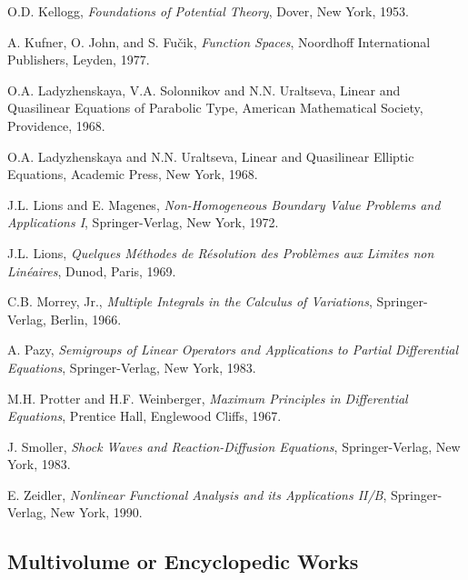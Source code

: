 \begin{list}{}{\setlength{\labelwidth}{3em}\setlength{\leftmargin}{4em}\setlength{\labelsep}{.8em}}
\item[{[Ke]}] O.D. Kellogg, \emph{Foundations of Potential Theory}, Dover, New York, 1953.

\item[{[KJF]}] A. Kufner, O. John, and S. Fučik, \emph{Function Spaces}, Noordhoff International Publishers, Leyden, 1977.

\item[{[LSU]}] O.A. Ladyzhenskaya, V.A. Solonnikov and N.N. Uraltseva, Linear and Quasilinear Equations of Parabolic Type, American Mathematical Society, Providence, 1968.

\item[{[LU]}] O.A. Ladyzhenskaya and N.N. Uraltseva, Linear and Quasilinear Elliptic Equations, Academic Press, New York, 1968.

\item[{[LM]}] J.L. Lions and E. Magenes, \emph{Non-Homogeneous Boundary Value Problems and Applications I}, Springer-Verlag, New York, 1972.

\item[{[Li]}] J.L. Lions, \emph{Quelques Méthodes de Résolution des Problèmes aux Limites non Linéaires}, Dunod, Paris, 1969.

\item[{[Mor]}] C.B. Morrey, Jr., \emph{Multiple Integrals in the Calculus of Variations}, Springer-Verlag, Berlin, 1966.

\item[{[Pa]}] A. Pazy, \emph{Semigroups of Linear Operators and Applications to Partial Differential Equations}, Springer-Verlag, New York, 1983.

\item[{[PW]}] M.H. Protter and H.F. Weinberger, \emph{Maximum Principles in Differential Equations}, Prentice Hall, Englewood Cliffs, 1967.

\item[{[Sm]}] J. Smoller, \emph{Shock Waves and Reaction-Diffusion Equations}, Springer-Verlag, New York, 1983.

\item[{[Ze]}] E. Zeidler, \emph{Nonlinear Functional Analysis and its Applications II/B}, Springer-Verlag, New York, 1990.
\end{list}

\subsection{Multivolume or Encyclopedic Works}\label{sec:references-multivolume-encyclopedic-works}

